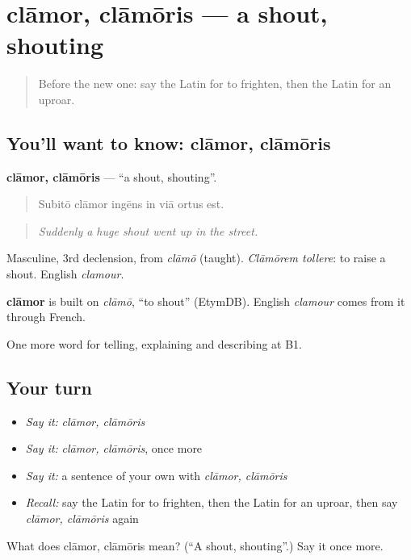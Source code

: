 \section[clāmor, clāmōris]{clāmor, clāmōris — a shout, shouting}

\label{lesson:LA-C321-clamor}



\begin{quote}
Before the new one: say the Latin for to frighten, then the Latin for an uproar.
\end{quote}

\subsection*{You'll want to know: clāmor, clāmōris}
\textbf{clāmor, clāmōris} — \textquotedblleft{}a shout, shouting\textquotedblright{}.

\begin{quote}
Subitō clāmor ingēns in viā ortus est.
\end{quote}

\begin{quote}
\emph{Suddenly a huge shout went up in the street.}
\end{quote}

Masculine, 3rd declension, from \emph{clāmō} (taught). \emph{Clāmōrem tollere}: to raise a shout. English \emph{clamour}.

\begin{cousinweb}
\textbf{clāmor} is built on \emph{clāmō}, \textquotedblleft{}to shout\textquotedblright{} (EtymDB). English \emph{clamour} comes from it through French.
\end{cousinweb}

\begin{grammarlens}[title={What you've built}]
One more word for telling, explaining and describing at B1.
\end{grammarlens}

\subsection*{Your turn}
\begin{itemize}
\raggedright
  \item \emph{Say it:} \emph{clāmor, clāmōris}
  \item \emph{Say it:} \emph{clāmor, clāmōris}, once more
  \item \emph{Say it:} a sentence of your own with \emph{clāmor, clāmōris}
  \item \emph{Recall:} say the Latin for to frighten, then the Latin for an uproar, then say \emph{clāmor, clāmōris} again
\end{itemize}

\begin{tcolorbox}[breakable,colback=teal!4,colframe=teal!35!black,title={Before you move on}]
What does clāmor, clāmōris mean? (\textquotedblleft{}A shout, shouting\textquotedblright{}.) Say it once more.
\end{tcolorbox}
